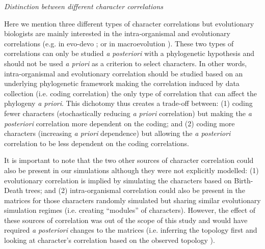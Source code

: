 \documentclass[12pt,letterpaper]{article}
\renewcommand{\subsection}[1]{%
\bigskip
\begin{center}
\begin{large}
\normalfont\itshape #1
\end{large}
\end{center}}
\begin{document}
\subsection{Distinction between different character correlations}
Here we mention three different types of character correlations but evolutionary biologists are mainly interested in the intra-organismal and evolutionary correlations (e.g. in evo-devo \citealt{goswami2006morphological}; or in macroevolution \citealt{fitzjohn2014much}).
These two types of correlations can only be studied \textit{a posteriori} with a phylogenetic hypothesis and should not be used \textit{a priori} as a criterion to select characters.
In other words, intra-organismal and evolutionary correlation should be studied based on an underlying phylogenetic framework making the correlation induced by data collection (i.e. coding correlation) the only type of correlation that can affect the phylogeny \textit{a priori}.
This dichotomy thus creates a trade-off between: (1) coding fewer characters (stochastically reducing \textit{a priori} correlation) but making the \textit{a posteriori} correlation more dependent on the coding;
and (2) coding more characters (increasing \textit{a priori} dependence) but allowing the \textit{a posteriori} correlation to be less dependent on the coding correlations.

It is important to note that the two other sources of character correlation could also be present in our simulations although they were not explicitly modelled:
(1) evolutionary correlation is implied by simulating the characters based on Birth-Death trees;
and (2) intra-organismal correlation could also be present in the matrices for those characters randomly simulated but sharing similar evolutionary simulation regimes (i.e. creating ``modules'' of characters).
However, the effect of these sources of correlation was out of the scope of this study and would have required \textit{a posteriori} changes to the matrices (i.e. inferring the topology first and looking at character's correlation based on the observed topology \citealt{Lande1983,Maddison1990,Pagel1994}).
\end{document}
